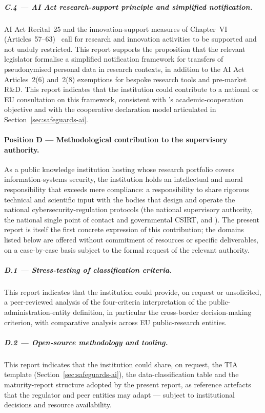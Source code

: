 \subparagraph{C.4 --- AI Act research-support principle and simplified notification.}
AI Act Recital~25 and the innovation-support measures of Chapter~VI
(Articles~57--63)~\cite{eu-ai-act} call for
research and innovation activities to be supported and not unduly
restricted. This report supports the proposition that the relevant
legislator formalise a simplified notification framework for transfers of
pseudonymised personal data in research contexts, in addition to
the AI Act Articles~2(6) and~2(8) exemptions for bespoke research
tools and pre-market R\&D. This report indicates that the
institution could contribute to a national or EU consultation on
this framework, consistent with 's
academic-cooperation objective and with the cooperative declaration
model articulated in Section~\ref{sec:safeguards-ai}.

\paragraph{Position D --- Methodological contribution to the supervisory authority.}
As a public knowledge institution hosting 
whose research portfolio covers information-systems
security, the institution holds an intellectual and moral
responsibility that exceeds mere compliance: a responsibility to
share rigorous technical and scientific input with the bodies
that design and operate the national cybersecurity-regulation
protocols (the national supervisory authority, the national single
point of contact and governmental CSIRT, and ).
The present report is itself the first concrete expression of
this contribution; the domains listed below are offered without
commitment of resources or specific deliverables, on a
case-by-case basis subject to the formal request of the relevant
authority.

\subparagraph{D.1 --- Stress-testing of classification criteria.}
This report indicates that the institution could provide, on
request or unsolicited, a peer-reviewed analysis of the
four-criteria interpretation of the public-administration-entity
definition, in particular the cross-border decision-making
criterion, with comparative analysis across EU public-research
entities.

\subparagraph{D.2 --- Open-source methodology and tooling.}
This report indicates that the institution could share, on
request, the TIA template (Section~\ref{sec:safeguards-ai}), the
data-classification table and the maturity-report
structure adopted by the present report, as reference artefacts
that the regulator and peer entities may adapt --- subject to
institutional decisions and resource availability.

